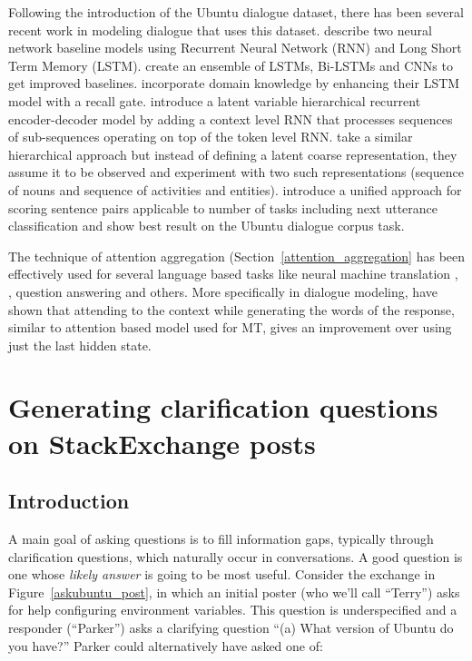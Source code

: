 \documentclass[11pt]{report}
\renewcommand\cite{\citep}	%
\begin{document}
Following the introduction of the Ubuntu dialogue dataset, there has been several recent work in modeling dialogue that uses this dataset. \cite{lowe2015ubuntu} describe two neural network baseline models using Recurrent Neural Network (RNN) and Long Short Term Memory (LSTM). 
\cite{kadlec2015improved} create an ensemble of LSTMs, Bi-LSTMs and CNNs to get improved baselines. 
\cite{xu2016incorporating} incorporate domain knowledge by enhancing their LSTM model with a recall gate.
\cite{serban2016hierarchical} introduce a latent variable hierarchical recurrent encoder-decoder model by adding a context level RNN that processes sequences of sub-sequences operating on top of the token level RNN.
\cite{serban2016multiresolution} take a similar hierarchical approach but instead of defining a latent coarse representation, they assume it to be observed and experiment with two such representations (sequence of nouns and sequence of activities and entities).
\cite{baudivs2016sentence} introduce a unified approach for scoring sentence pairs applicable to number of tasks including next utterance classification and show best result on the Ubuntu dialogue corpus task. 

The technique of attention aggregation (Section~\ref{attention_aggregation} has been effectively used for several language based tasks like neural machine translation \cite{bahdanau2014neural}, \cite{luong2015effective}, question answering \cite{} and others. More specifically in dialogue modeling, \cite{yao2016attentional} have shown that attending to the context while generating the words of the response, similar to attention based model used for MT, gives an improvement over using just the last hidden state.


\newpage

\chapter{Generating clarification questions on StackExchange posts}\label{stackexchange}

\section{Introduction}\label{introduction}

A main goal of asking questions is to fill information gaps, typically through clarification questions, which naturally occur in conversations. 
A good question is one whose \emph{likely answer} is going to be most useful.
Consider the exchange in Figure~\ref{askubuntu_post}, in which an initial poster (who we'll call ``Terry'') asks for help configuring environment variables.
This question is underspecified and a responder (``Parker'') asks a clarifying question ``\textsf{\small (a) What version of Ubuntu do you have?}''
Parker could alternatively have asked one of:
\end{document}
